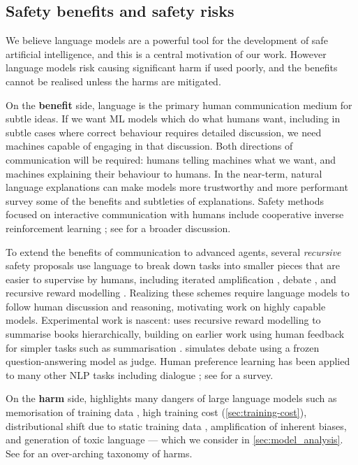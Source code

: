 \documentclass[11pt, a4paper, logo, internal, copyright, nonumbering]{deepmind}
\begin{document}
\subsection{Safety benefits and safety risks}
\label{discussion:safety_benefits_and_risks}
We believe language models are a powerful tool for the development of safe artificial intelligence,
and this is a central motivation of our work.  However language models risk causing significant harm if used poorly, and the benefits cannot be realised unless the harms are mitigated. 

On the \textbf{benefit} side, language is the primary human communication medium for subtle ideas.  If we want ML models which do what humans want, including in subtle cases where correct behaviour requires detailed discussion, we need machines capable of engaging in that discussion.  Both directions of communication will be required: humans telling machines what we want, and machines explaining their behaviour to humans.
In the near-term, natural language explanations can make models more trustworthy \citep{camburu2018snli} and more performant
\cite{rajani2019explain, coyle2020explaining,kasirzadeh2021reasons} survey some of the benefits and subtleties of explanations. Safety methods focused on interactive communication with humans include cooperative inverse reinforcement learning \citep{hadfield2016cooperative}; see \cite{russell2020compatible} for a broader discussion.

To extend the benefits of communication to advanced agents, several \textit{recursive} safety proposals use language to break down tasks into smaller pieces that are easier to supervise by humans, including iterated amplification \citep{christiano2018amplification}, debate \citep{irving2018debate,irving2019social}, and recursive reward modelling \citep{leike2018scalable}.  Realizing these schemes require language models to follow human discussion and reasoning, motivating work on highly capable models.  Experimental work is nascent: \cite{wu2021recursively} uses recursive reward modelling to summarise books hierarchically, building on earlier work using human feedback for simpler tasks such as summarisation \citep{bohm2019better,ziegler2019fine,stiennon2020learning}. \citet{perez2019finding} simulates debate using a frozen question-answering model as judge.  Human preference learning has been applied to many other NLP tasks including dialogue \citep{jaques2020human}; see \cite{wang2021putting} for a survey.

On the \textbf{harm} side, \cite{bender2021dangers} highlights many dangers of large language models such as memorisation of training data \citep{carlini2021extracting,abubakar2021copilot}, high training cost (\autoref{sec:training-cost}), distributional shift due to static training data \citep{lazaridou2021pitfalls}, amplification of inherent biases, and generation of toxic language \citep{gehman2020realtoxicityprompts} --- which we consider in \autoref{sec:model_analysis}. See \citet{weidinger2021harms} for an over-arching taxonomy of harms.
\end{document}

